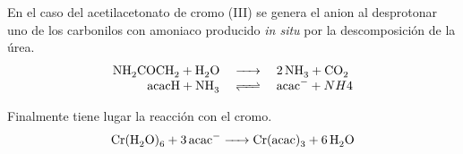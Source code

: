 \documentclass[fleqn,10pt]{SelfArx} %
\begin{document}
	En el caso del acetilacetonato de cromo (III) se genera el anion al desprotonar uno de los carbonilos con amoniaco producido \textit{in situ} por la descomposici\'on de la \'urea.
	\begin{equation}
	    \begin{array}{rcl}
	        \ce{NH2COCH2 + H2O} & \ce{->} & \ce{2NH3 + CO2} \\
	        \ce{acacH + NH3} & \ce{<=>} & \ce{acac-} + NH4 
	    \end{array}
	\end{equation}
	
	Finalmente tiene lugar la reacci\'on con el cromo.
	\begin{equation}
	    \ce{Cr(H2O)6 + 3acac- -> Cr(acac)3 + 6H2O}
	\end{equation}
	
\end{document}
